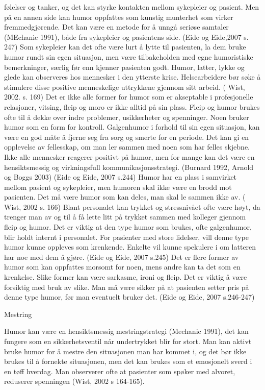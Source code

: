 følelser og tanker, og det kan styrke kontakten mellom sykepleier og pasient.
Men på en annen side kan humor oppfattes som kunstig munterhet som virker
fremmedgjørende. Det kan være en metode for å unngå seriøse samtaler (MEchanic
1991), både fra sykepleier og pasientens side. (Eide og Eide,2007 s. 247) Som
sykepleier kan det ofte være lurt å lytte til pasienten, la dem bruke humor
rundt sin egen situasjon, men være tilbakeholden med egne humoristiske
bemerkninger, særlig før enn kjenner pasienten godt. Humor, latter, lykke og
glede kan observeres hos mennesker i den ytterste krise. Helsearbeidere bør
søke å stimulere disse positive menneskelige uttrykkene gjennom sitt arbeid.  (
Wist, 2002. s. 169) Det er ikke alle former for humor som er akseptable i
profesjonelle relasjoner, vitsing, fleip og moro er ikke alltid på sin plass.
Fleip og humor brukes ofte til å dekke over indre problemer, usikkerheter og
spenninger. Noen bruker humor som en form for kontroll. Galgenhumor i forhold
til sin egen situasjon, kan være en god måte å fjerne seg fra sorg og smerte
for en periode. Det kan gi en opplevelse av fellesskap, om man ler sammen med
noen som har felles skjebne. Ikke alle mennesker reagerer positivt på humor,
men for mange kan det være en hensiktsmessig og virkningsfull
kommunikasjonsstrategi. (Burnard 1992, Arnold og Boggs 2003) (Eide og Eide,
2007 s.244) Humor har en plass i samvirket mellom pasient og sykepleier, men
humoren skal ikke være en brodd mot pasienten. Det må være humor som kan deles,
man skal le sammen ikke av. ( Wist, 2002 s. 166) Blant personalet kan trykket
og stressnivået ofte være høyt, da trenger man av og til å få lette litt på
trykket sammen med kolleger gjennom fleip og humor. Det er viktig at den type
humor som brukes, ofte galgenhumor, blir holdt internt i personalet. For
pasienter med store lidelser, vill denne type humor kunne oppleves som
krenkende. Enkelte vil kunne spekulere i om latteren har noe med dem å gjøre.
(Eide og Eide, 2007 s.245) Det er flere former av humor som kan oppfattes
morsomt for noen, mens andre kan ta det som en krenkelse. Slike former kan være
sarkasme, ironi og fleip. Det er viktig å være forsiktig med bruk av slike. Man
må være sikker på at pasienten setter pris på denne type humor, før man
eventuelt bruker det. (Eide og Eide, 2007 s.246-247)

Mestring

Humor kan være en hensiktsmessig mestringstrategi (Mechanic 1991), det kan
fungere som en sikkerhetsventil når undertrykket blir for stort.  Man kan
aktivt bruke humor for å mestre den situasjonen man har kommet i, og det bør
ikke brukes til å fornekte situasjonen, men det kan brukes som et emosjonelt
sverd i en tøff hverdag. Man observerer ofte at pasienter som spøker med
alvoret, reduserer spenningen (Wist, 2002 s 164-165).

